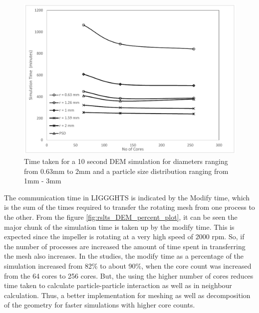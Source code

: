 \documentclass[preprint,11pt,authoryear]{elsarticle}
\begin{document}
\begin{figure}[H]
\centering
\includegraphics[scale=0.6]{rslts_DEM_timing_plots.pdf}
\caption{Time taken for a 10 second DEM simulation for diameters ranging from 0.63mm to 2mm and 
a particle size distribution ranging from 1mm - 3mm}
\label{fig:rslts_DEM_timing_studies}
\end{figure}
 The communication time in LIGGGHTS is indicated by the Modify time, which is the sum of the 
times required to transfer the rotating mesh from one process to the other. From the figure 
\ref{fig:rslts_DEM_percent_plot}, it can be seen the major chunk of the simulation time is taken up by 
the modify time. This is expected since the impeller is rotating at a very high speed of 2000 rpm. So, if 
the number of processes are increased the amount of time spent in transferring the mesh also 
increases. In the studies, the modify time as a percentage of the simulation increased from 82\% to 
about 90\%, when the core count was increased from the 64 cores to 256 cores. But, the using the 
higher number of cores reduces time taken to calculate particle-particle interaction as well as in 
neighbour calculation. Thus, a better implementation for meshing as well as decomposition of the 
geometry for faster simulations with higher core counts.
\end{document}
